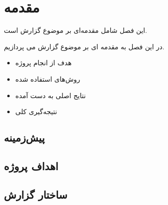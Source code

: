 \chapter{مقدمه}
\label{ch:introduction}

این فصل شامل مقدمه‌ای بر موضوع گزارش است.

در این فصل به مقدمه ای بر موضوع گزارش می پردازیم.

\begin{itemize}
    \item هدف از انجام پروژه
    \item روش‌های استفاده شده
    \item نتایج اصلی به دست آمده
    \item نتیجه‌گیری کلی
\end{itemize}

\section{پیش‌زمینه}
\label{sec:ch1-background}


\section{اهداف پروژه}
\label{sec:ch1-objectives}


\section{ساختار گزارش}
\label{sec:ch1-structure}


